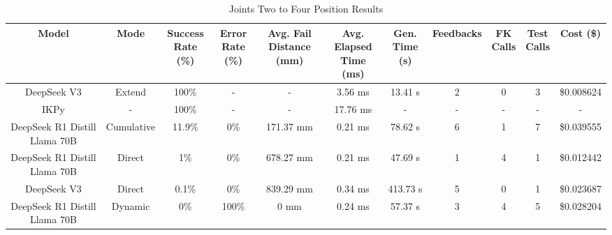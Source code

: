 \begin{landscape}
\begin{table}[H]
\tiny
\renewcommand{\arraystretch}{1.2}
\caption{Joints Two to Four Position Results}
\begin{center}
\begin{tabular}{|c|c|c|c|c|c|c|c|c|c|c|}
    \hline
    \textbf{Model} & 
    \textbf{Mode} & 
    \makecell{\textbf{Success}\\\textbf{Rate (\%)}} &
    \makecell{\textbf{Error}\\\textbf{Rate (\%)}} &
    \makecell{\textbf{Avg. Fail}\\\textbf{Distance (mm)}} &
    \makecell{\textbf{Avg. Elapsed}\\\textbf{Time (ms)}} &
    \makecell{\textbf{Gen.}\\\textbf{Time (s)}} &
    \textbf{Feedbacks} &
    \makecell{\textbf{FK}\\\textbf{Calls}} &
    \makecell{\textbf{Test}\\\textbf{Calls}} &
    \textbf{Cost (\$)} \\
    \hline
    DeepSeek V3 & Extend & 100\% & - & - & 3.56 ms & 13.41 s & 2 & 0 & 3 & \$0.008624 \\
    \hline
    IKPy & - & 100\% & - & - & 17.76 ms & - & - & - & - & - \\
    \hline
    DeepSeek R1 Distill Llama 70B & Cumulative & 11.9\% & 0\% & 171.37 mm & 0.21 ms & 78.62 s & 6 & 1 & 7 & \$0.039555 \\
    \hline
    DeepSeek R1 Distill Llama 70B & Direct & 1\% & 0\% & 678.27 mm & 0.21 ms & 47.69 s & 1 & 4 & 1 & \$0.012442 \\
    \hline
    DeepSeek V3 & Direct & 0.1\% & 0\% & 839.29 mm & 0.34 ms & 413.73 s & 5 & 0 & 1 & \$0.023687 \\
    \hline
    DeepSeek R1 Distill Llama 70B & Dynamic & 0\% & 100\% & 0 mm & 0.24 ms & 57.37 s & 3 & 4 & 5 & \$0.028204 \\
    \hline
\end{tabular}
\label{Results-Position-2-4}
\end{center}
\end{table}


\end{landscape}
